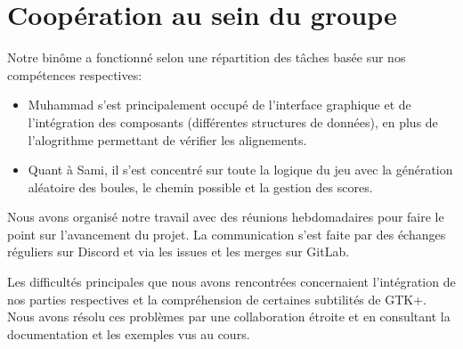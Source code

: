 \section{Coopération au sein du groupe}\label{cooperation}

Notre binôme a fonctionné selon une répartition des tâches basée sur nos compétences respectives:

\begin{itemize}
    \item Muhammad s'est principalement occupé de l'interface graphique et 
    de l'intégration des composants (différentes structures de données), en plus 
    de l'alogrithme permettant de vérifier les alignements.
    \item Quant à Sami, il s'est concentré sur toute la logique du jeu avec la génération 
    aléatoire des boules, le chemin possible et la gestion des scores. 
\end{itemize}

Nous avons organisé notre travail avec des réunions hebdomadaires pour faire 
le point sur l'avancement du projet. 
La communication s'est faite par des échanges réguliers sur Discord et via les issues 
et les merges sur GitLab.

Les difficultés principales que nous avons rencontrées concernaient 
l'intégration de nos parties respectives et la compréhension de certaines subtilités de GTK+. 
Nous avons résolu ces problèmes par une collaboration étroite et en consultant la documentation et les exemples vus au cours.
